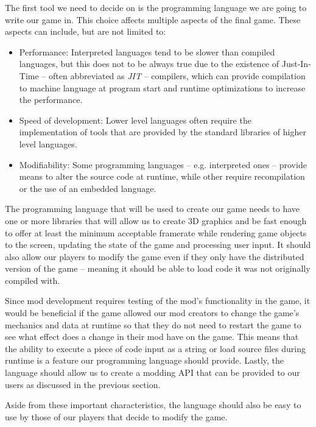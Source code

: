 The first tool we need to decide on is the programming language we are going to write our game in.
This choice affects multiple aspects of the final game. These aspects can include, but are not limited to:

\begin{itemize}
    \item Performance: Interpreted languages tend to be slower than compiled languages, but this
        does not to be always true due to the existence of Just-In-Time -- often abbreviated as \emph{JIT} -- compilers, 
        which can provide compilation
        to machine language at program start and runtime optimizations to increase the performance.
    \item Speed of development: Lower level languages often require the implementation of tools that
        are provided by the standard libraries of higher level languages.
    \item Modifiability: Some programming languages -- e.g. interpreted ones -- provide means to
        alter the source code at runtime, while other require recompilation or the use of an embedded language.
\end{itemize}

The programming language that will be used to create our game needs to have one or more libraries that will allow us
to create 3D graphics and be fast enough to offer at least the minimum acceptable framerate while rendering game objects
to the screen, updating the state of the game and processing user input. It should also allow our players to modify the game
even if they only have the distributed version of the game -- meaning it should be able to load code it was not originally compiled
with.

Since mod development requires testing of the mod's functionality in the game, it would be beneficial if the game allowed
our mod creators to change the game's mechanics and data at runtime so that they do not need to restart the game
to see what effect does a change in their mod have on the game. This means that the ability to execute a piece of code
input as a string or load source files during runtime is a feature our programming language should provide.
Lastly, the language should allow us to create a modding API that can be provided to our users as discussed in the previous section.

Aside from these important characteristics, the language should also be easy to use by those of our players that decide to
modify the game.

